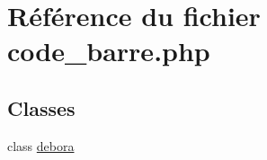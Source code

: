 \hypertarget{code__barre_8php}{
\section{R\'{e}f\'{e}rence du fichier code\_\-barre.php}
\label{code__barre_8php}
}
\subsection*{Classes}
\begin{CompactItemize}
\item 
class \hyperlink{classdebora}{debora}
\end{CompactItemize}
